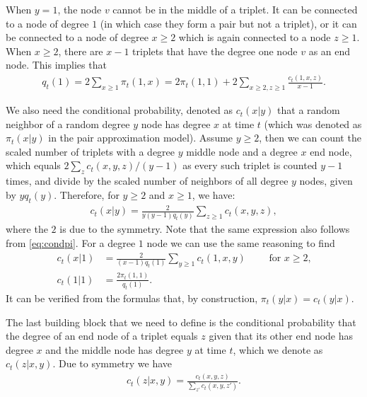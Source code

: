 \documentclass[acmsmall,nonacm]{acmart}
\begin{document}
When $y=1$, the node $v$ cannot be in the middle of a triplet. It can be connected to a node of degree $1$ (in which case they form a pair but not a triplet), or it can be connected to a node of degree $x\ge2$ which is again connected to a node $z\ge1$. When $x\ge2$, there are $x-1$ triplets that have the degree one node $v$ as an end node. This implies that 
\begin{align*}
    q_t(1) = 2\sum_{x\ge1} \pi_t(1,x) = 2 \pi_t(1,1) + 2 \sum_{x \geq 2,z \geq 1} \frac{c_t(1,x,z)}{x-1}.
\end{align*}

We also need the conditional probability, denoted as $c_t(x|y)$ that a random neighbor of a random degree $y$ node has degree $x$
at time $t$ (which was denoted as $\pi_t(x|y)$ in the pair approximation model). Assume $y\geq 2$, then we can count the scaled number of triplets with a degree $y$ middle node and a degree $x$ end node,
which equals $2\sum_z c_t(x,y,z) / (y-1)$ as every such triplet is counted $y-1$ times, and
divide by the scaled number of neighbors of all degree $y$ nodes, given by $yq_t(y)$.
Therefore, for $y\ge2$ and $x\ge1$, we have:
\begin{align}
    c_t(x|y) = \frac{2}{y(y-1)q_t(y)}\sum_{z \geq 1} c_t(x,y,z), 
\end{align}
where the $2$ is due to the symmetry.  Note that the same expression also follows from \eqref{eq:condpi}. For a degree $1$ node we can use the same reasoning to find
\begin{align}
    c_t(x|1) &= \frac{2}{(x-1)q_t(1)}\sum_{y \geq 1} c_t(1,x,y)\qquad \text{ for $x\ge2$,}\\
    c_t(1|1) &= \frac{2\pi_t(1,1)}{q_t(1)}.
\end{align}
It can be verified from the formulas that, by construction, $\pi_t(y|x)=c_t(y|x)$.

The last building block that we need to define is the conditional probability that the degree of an end node
of a triplet equals $z$ given that its other end node has degree $x$ and the middle node has degree $y$
at time $t$, which
we denote as $c_t(z|x,y)$. Due to symmetry we have
\begin{align}
    c_t(z|x,y) = \frac{c_t(x,y,z)}{\sum_{z'} c_t(x,y,z')}.
\end{align}
\end{document}
